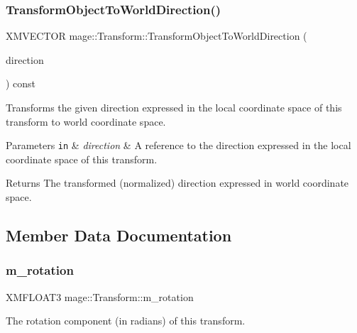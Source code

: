 \subsubsection{\texorpdfstring{Transform\+Object\+To\+World\+Direction()}{TransformObjectToWorldDirection()}}
{\footnotesize\ttfamily X\+M\+V\+E\+C\+T\+OR mage\+::\+Transform\+::\+Transform\+Object\+To\+World\+Direction (\begin{DoxyParamCaption}\item[{const X\+M\+V\+E\+C\+T\+OR \&}]{direction }\end{DoxyParamCaption}) const\hspace{0.3cm}{\ttfamily [private]}}

Transforms the given direction expressed in the local coordinate space of this transform to world coordinate space.


\begin{DoxyParams}[1]{Parameters}
\mbox{\tt in}  & {\em direction} & A reference to the direction expressed in the local coordinate space of this transform. \\
\hline
\end{DoxyParams}
\begin{DoxyReturn}{Returns}
The transformed (normalized) direction expressed in world coordinate space. 
\end{DoxyReturn}


\subsection{Member Data Documentation}
\hypertarget{structmage_1_1_transform_a037b4fb338bfe79aa2ab1a2e809c40df}{}\label{structmage_1_1_transform_a037b4fb338bfe79aa2ab1a2e809c40df} 
\subsubsection{\texorpdfstring{m\+\_\+rotation}{m\_rotation}}
{\footnotesize\ttfamily X\+M\+F\+L\+O\+A\+T3 mage\+::\+Transform\+::m\+\_\+rotation\hspace{0.3cm}{\ttfamily [private]}}

The rotation component (in radians) of this transform. \hypertarget{structmage_1_1_transform_a25d15c85b93037bab5b755c86bef0b54}{}\label{structmage_1_1_transform_a25d15c85b93037bab5b755c86bef0b54} 
